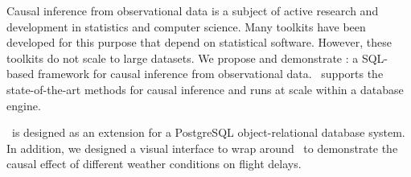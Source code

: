 Causal inference from observational data is a subject of active research and development in statistics and computer science. Many toolkits have been developed for this purpose that depend on statistical software.
However, these toolkits do not scale to large datasets.
We propose and demonstrate \GSQL: a SQL-based framework for causal inference from observational data.
\GSQL\ supports the state-of-the-art methods for causal inference and runs at scale within a database engine.
 \GSQL\ is designed as an extension for a PostgreSQL object-relational database system. In addition, we designed a visual interface to wrap around \GSQL\  to demonstrate the causal effect of different weather conditions on flight delays. 
